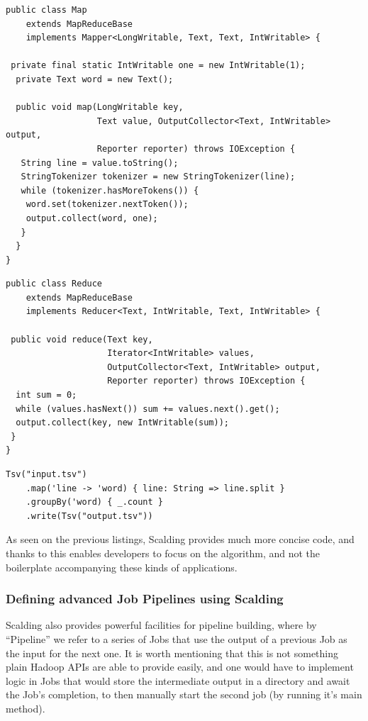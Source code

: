 \begin{lstlisting}[caption={Word Count example Job -- Map implementation using plain Java Map Reduce API}, label={lst:hadoop-mr-map}]
public class Map 
    extends MapReduceBase 
    implements Mapper<LongWritable, Text, Text, IntWritable> {

 private final static IntWritable one = new IntWritable(1);
  private Text word = new Text();

  public void map(LongWritable key, 
                  Text value, OutputCollector<Text, IntWritable> output, 
                  Reporter reporter) throws IOException {
   String line = value.toString();
   StringTokenizer tokenizer = new StringTokenizer(line);
   while (tokenizer.hasMoreTokens()) {
    word.set(tokenizer.nextToken());
    output.collect(word, one);
   }
  }
}
\end{lstlisting}

\newpage
\begin{lstlisting}[caption={Word Count example Job -- Reduce implementation using plain Java Map Reduce API}, label={lst:hadoop-mr-reduce}]
public class Reduce 
    extends MapReduceBase 
    implements Reducer<Text, IntWritable, Text, IntWritable> {

 public void reduce(Text key, 
                    Iterator<IntWritable> values, 
                    OutputCollector<Text, IntWritable> output, 
                    Reporter reporter) throws IOException {
  int sum = 0;
  while (values.hasNext()) sum += values.next().get();
  output.collect(key, new IntWritable(sum));
 }
}
\end{lstlisting}


\begin{lstlisting}[caption={Simplest Scalding job used in Oculus -- each frame perceptual hashing}, label={lst:simplest-scalding-job}]
  Tsv("input.tsv")
    .map('line -> 'word) { line: String => line.split }
    .groupBy('word) { _.count }
    .write(Tsv("output.tsv"))
\end{lstlisting}

As seen on the previous listings, Scalding provides much more concise code, and thanks to this enables developers to focus on the algorithm, and not the boilerplate accompanying these kinds of applications.

\subsubsection{Defining advanced Job Pipelines using Scalding}
\label{sec:defining-pipelines-basics}
Scalding also provides powerful facilities for pipeline building, where by ``Pipeline'' we refer to a series of Jobs that use the output of a previous Job as the input for the next one. It is worth mentioning that this is not something plain Hadoop APIs are able to provide easily, and one would have to implement logic in Jobs that would store the intermediate output in a directory and await the Job's completion, to then manually start the second job (by running it's main method).

